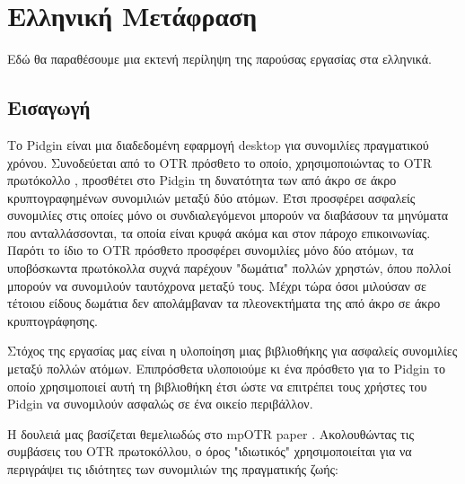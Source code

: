 
\chapter{Ελληνική Μετάφραση}
\label{appendices:greek}

Εδώ θα παραθέσουμε μια εκτενή περίληψη της παρούσας εργασίας στα ελληνικά.


\section{Εισαγωγή}
Το Pidgin είναι μια διαδεδομένη εφαρμογή desktop για συνομιλίες πραγματικού χρόνου.
Συνοδεύεται από το OTR πρόσθετο το οποίο, χρησιμοποιώντας το OTR πρωτόκολλο \cite{otr} \cite{otr_improvedauth} \cite{otr_userstudy}, προσθέτει στο Pidgin τη δυνατότητα των από άκρο σε άκρο κρυπτογραφημένων συνομιλιών μεταξύ δύο ατόμων.
Έτσι προσφέρει ασφαλείς συνομιλίες στις οποίες μόνο οι συνδιαλεγόμενοι μπορούν να διαβάσουν τα μηνύματα που ανταλλάσσονται, τα οποία είναι κρυφά ακόμα και στον πάροχο επικοινωνίας.
Παρότι το ίδιο το OTR πρόσθετο προσφέρει συνομιλίες μόνο δύο ατόμων, τα υποβόσκωντα πρωτόκολλα συχνά παρέχουν "δωμάτια" πολλών χρηστών, όπου πολλοί μπορούν να συνομιλούν ταυτόχρονα μεταξύ τους.
Μέχρι τώρα όσοι μιλούσαν σε τέτοιου είδους δωμάτια δεν απολάμβαναν τα πλεονεκτήματα της από άκρο σε άκρο κρυπτογράφησης.

Στόχος της εργασίας μας είναι η υλοποίηση μιας βιβλιοθήκης για ασφαλείς συνομιλίες μεταξύ πολλών ατόμων.
Επιπρόσθετα υλοποιούμε κι ένα πρόσθετο για το Pidgin το οποίο χρησιμοποιεί αυτή τη βιβλιοθήκη έτσι ώστε να επιτρέπει τους χρήστες του Pidgin να συνομιλούν ασφαλώς σε ένα οικείο περιβάλλον.

Η δουλειά μας βασίζεται θεμελιωδώς στο mpOTR paper \cite{mpotr}.
Ακολουθώντας τις συμβάσεις του OTR πρωτοκόλλου, ο όρος "ιδιωτικός" χρησιμοποιείται για να περιγράψει τις ιδιότητες των συνομιλιών της πραγματικής ζωής:

